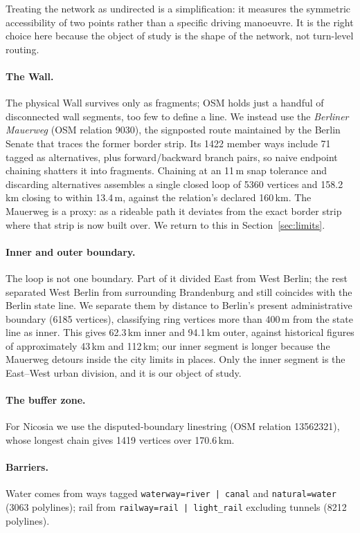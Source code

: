 \documentclass[11pt,a4paper]{article}
\begin{document}
Treating the network as undirected is a simplification: it measures the
symmetric accessibility of two points rather than a specific driving manoeuvre.
It is the right choice here because the object of study is the shape of the
network, not turn-level routing.

\paragraph{The Wall.} The physical Wall survives only as fragments; OSM holds
just a handful of disconnected wall segments, too few to define a line. We
instead use the \emph{Berliner Mauerweg} (OSM relation 9030), the signposted
route maintained by the Berlin Senate that traces the former border strip. Its
1422 member ways include 71 tagged as
alternatives, plus forward/backward branch pairs, so naive endpoint chaining
shatters it into fragments. Chaining at an 11\,m snap tolerance and discarding
alternatives assembles a single closed loop of 5360 vertices and
158.2\,km closing to within 13.4\,m, against the relation's
declared 160\,km. The Mauerweg is a proxy: as a rideable path it deviates from
the exact border strip where that strip is now built over. We return to this in
Section~\ref{sec:limits}.

\paragraph{Inner and outer boundary.} The loop is not one boundary. Part of it
divided East from West Berlin; the rest separated West Berlin from surrounding
Brandenburg and still coincides with the Berlin state line. We separate them by
distance to Berlin's present administrative boundary
(6185 vertices), classifying ring vertices more than 400\,m
from the state line as inner. This gives 62.3\,km inner and
94.1\,km outer, against historical figures of approximately 43\,km and
112\,km; our inner segment is longer because the Mauerweg detours inside the
city limits in places. Only the inner segment is the East--West urban division,
and it is our object of study.

\paragraph{The buffer zone.} For Nicosia we use the disputed-boundary linestring
(OSM relation 13562321), whose longest chain gives 1419
vertices over 170.6\,km.

\paragraph{Barriers.} Water comes from ways tagged
\texttt{waterway=river\,|\,canal} and \texttt{natural=water}
(3063 polylines); rail from \texttt{railway=rail\,|\,light\_rail}
excluding tunnels (8212 polylines).
\end{document}
